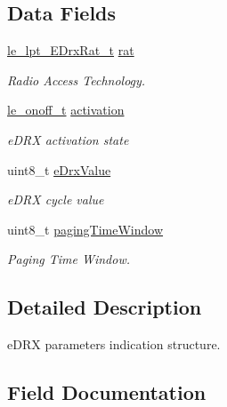\subsection*{Data Fields}
\begin{DoxyCompactItemize}
\item 
\hyperlink{le__lpt__interface_8h_a4094c01923d2065adb1557b6ab2121d5}{le\+\_\+lpt\+\_\+\+E\+Drx\+Rat\+\_\+t} \hyperlink{structpa__lpt___e_drx_params_indication__t_aad772f6bb0038758f44561c6857ece82}{rat}
\begin{DoxyCompactList}\small\item\em Radio Access Technology. \end{DoxyCompactList}\item 
\hyperlink{le__basics_8h_ae2138c90c41d30e2d510be01d8b374da}{le\+\_\+onoff\+\_\+t} \hyperlink{structpa__lpt___e_drx_params_indication__t_a0a259433b98e8ad1f6175322c3b4b42b}{activation}
\begin{DoxyCompactList}\small\item\em e\+D\+RX activation state \end{DoxyCompactList}\item 
uint8\+\_\+t \hyperlink{structpa__lpt___e_drx_params_indication__t_a54889e981bf5bb497b6dc7043b6e31db}{e\+Drx\+Value}
\begin{DoxyCompactList}\small\item\em e\+D\+RX cycle value \end{DoxyCompactList}\item 
uint8\+\_\+t \hyperlink{structpa__lpt___e_drx_params_indication__t_ae6bcdb476f062ac6fe226a5b8bebffb6}{paging\+Time\+Window}
\begin{DoxyCompactList}\small\item\em Paging Time Window. \end{DoxyCompactList}\end{DoxyCompactItemize}


\subsection{Detailed Description}
e\+D\+RX parameters indication structure. 

\subsection{Field Documentation}
